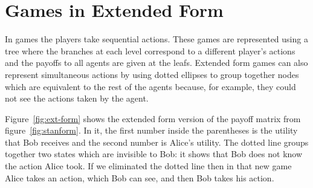 \section{Games in Extended Form}
\label{sec:games-extended-form}

In  games the players take sequential actions. These
games are represented using a tree where the branches at each level
correspond to a different player's actions and the payoffs to all
agents are given at the leafs. Extended form games can also represent
simultaneous actions by using dotted ellipses to group together nodes
which are equivalent to the rest of the agents because, for example,
they could not see the actions taken by the agent.

\begin{SCfigure}
  \begin{minipage}{1.0\linewidth}
\begin{center}
\end{center}
  \end{minipage}
  \caption{Game in extended form that corresponds to the normal form
  game from Figure~\ref{fig:stanform}.}
  \label{fig:ext-form}
\end{SCfigure}


Figure~\ref{fig:ext-form} shows the extended form version of the
payoff matrix from figure~\ref{fig:stanform}. In it, the first number
inside the parentheses is the utility that Bob receives and the second
number is Alice's utility.  The dotted line groups together two states
which are invisible to Bob: it shows that Bob does not know the action
Alice took. If we eliminated the dotted line then in that new game
Alice takes an action, which Bob can see, and then Bob takes his
action.

